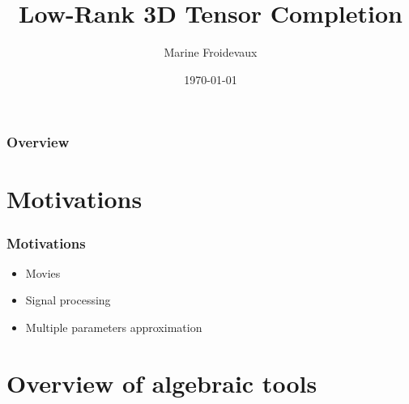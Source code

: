 \documentclass{beamer}
\title[Low-Rank Tensor Completion]{Low-Rank 3D Tensor Completion} %
\author{Marine Froidevaux} %
\institute[EPFL] %
{
\'Ecole Polytechnique F\'ed\'erale de Lausanne \\ %
\medskip
\textit{marine.froidevaux@epfl.ch} %
}
\date{\today} %
\begin{document}
\begin{frame}
\titlepage %
\end{frame}

\begin{frame}
\frametitle{Overview} %
\tableofcontents %
\end{frame}


\section{Motivations} %


\begin{frame}
\frametitle{Motivations}
\begin{itemize}
\item Movies
\item Signal processing
\item Multiple parameters approximation
\end{itemize}
\end{frame}

\section{Overview of algebraic tools} %
\end{document}
